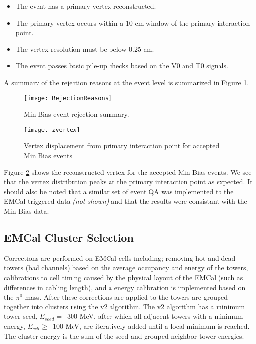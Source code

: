 \begin{itemize}
  \item The event has a primary vertex reconstructed.
  \item The primary vertex occurs within a 10 cm window of the primary interaction point.
  \item The vertex resolution must be below 0.25 cm.
  \item The event passes basic pile-up checks based on the V0 and T0 signals.
\end{itemize}

\noindent
A summary of the rejection reasons at the event level is summarized in Figure \ref{fig:eventqa}.

\begin{figure}[h]
\texttt{[image: RejectionReasons]}
\centering
\caption{Min Bias event rejection summary.}
\label{fig:eventqa}
\end{figure}

\begin{figure}[h]
\texttt{[image: zvertex]}
\centering
\caption{Vertex displacement from primary interaction point for accepted Min Bias events.}
\label{fig:vertrec}
\end{figure}

\noindent 
Figure \ref{fig:vertrec} shows the reconstructed vertex for the accepted Min Bias events.  We see that the vertex distribution peaks at the primary interaction point as expected.  It should also be noted that a similar set of event QA was implemented to the EMCal triggered data \textit{(not shown)} and that the results were consistant with the Min Bias data.

\subsection{EMCal Cluster Selection}
Corrections are performed on EMCal cells including; removing hot and dead towers (bad channels) based on the average occupancy and energy of the towers, calibrations to cell timing caused by the physical layout of the EMCal (such as differences in cabling length), and a energy calibration is implemented based on the $\pi^{0}$ mass.  After these corrections are applied to the towers are grouped together into clusters using the v2 algorithm.  The v2 algorithm has a minimum tower seed, $E_{seed} = \,$ 300 MeV, after which all adjacent towers with a minimum energy, $E_{cell} \geq \,$ 100 MeV, are iteratively added until a local minimum is reached.  The cluster energy is the sum of the seed and grouped neighbor tower energies.   

